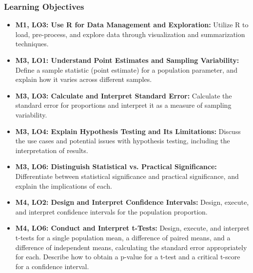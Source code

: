 \begin{frame}
    \frametitle{Learning Objectives}
    \begin{itemize}
        \item \textbf{M1, LO3: Use R for Data Management and Exploration:} Utilize R to load, pre-process, and explore data through visualization and summarization techniques.
        \item \textbf{M3, LO1: Understand Point Estimates and Sampling Variability:} Define a sample statistic (point estimate) for a population parameter, and explain how it varies across different samples.
        \item \textbf{M3, LO3: Calculate and Interpret Standard Error:} Calculate the standard error for proportions and interpret it as a measure of sampling variability.
        \item \textbf{M3, LO4: Explain Hypothesis Testing and Its Limitations:} Discuss the use cases and potential issues with hypothesis testing, including the interpretation of results.
        \item \textbf{M3, LO6: Distinguish Statistical vs. Practical Significance:} Differentiate between statistical significance and practical significance, and explain the implications of each.
        \item \textbf{M4, LO2: Design and Interpret Confidence Intervals:} Design, execute, and interpret confidence intervals for the population proportion.
        \item \textbf{M4, LO6: Conduct and Interpret t-Tests:} Design, execute, and interpret t-tests for a single population mean, a difference of paired means, and a difference of independent means, calculating the standard error appropriately for each. Describe how to obtain a p-value for a t-test and a critical t-score for a confidence interval.    
    \end{itemize}
\end{frame}
    
